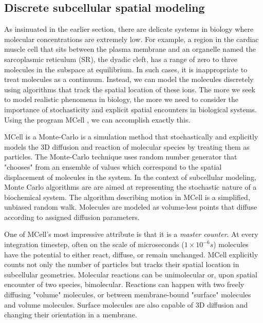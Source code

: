 \documentclass[12pt]{ucsddissertation}
\begin{document}
\begin{dissertationintroduction}

\subsection{Discrete subcellular spatial modeling}
As insinuated in the earlier section, there are delicate systems in biology where molecular concentrations are extremely low. For example, a region in the cardiac muscle cell that sits between the plasma membrane and an organelle named the sarcoplasmic reticulum (SR), the dyadic cleft, has a range of zero to three molecules in the subspace at equilibrium\cite{Bers2002}. In such cases, it is inappropriate to treat molecules as a continuum. Instead, we can model the molecules discretely using algorithms that track the spatial location of these ions. The more we seek to model realistic phenomena in biology, the more we need to consider the importance of stochasticity and explicit spatial encounters in biological systems. Using the program MCell \cite{Stiles2001a,Kerr2008}, we can accomplish exactly this. 

MCell is a Monte-Carlo is a simulation method that stochastically and explicitly models the 3D diffusion and reaction of molecular species by treating them as particles. The Monte-Carlo technique uses random number generator that "chooses" from an ensemble of values which correspond to the spatial displacement of molecules in the system. In the context of subcellular modeling, Monte Carlo algorithms are are aimed at representing the stochastic nature of a biochemical system. The algorithm describing motion in MCell is a simplified, unbiased random walk. Molecules are modeled as volume-less points that diffuse according to assigned diffusion parameters. 

One of MCell's most impressive attribute is that it is a \textit{master counter}. At every integration timestep, often on the scale of microseconds ($1 \times 10^{-6}s$) molecules have the potential to either react, diffuse, or remain unchanged. MCell explicitly counts not only the number of particles but tracks their spatial location in subcellular geometries. Molecular reactions can be unimolecular or, upon spatial encounter of two species, bimolecular. Reactions can happen with two freely diffusing "volume" molecules, or between membrane-bound "surface" molecules and volume molecules. Surface molecules are also capable of 3D diffusion and changing their orientation in a membrane. 


\end{dissertationintroduction}
\end{document}

